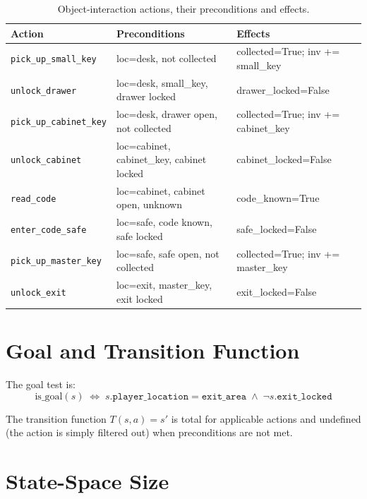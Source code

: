 \documentclass[12pt, a4paper]{report}
\begin{document}
\begin{table}[H]
\centering
\caption{Object-interaction actions, their preconditions and effects.}
\label{tab:actions}
\begin{tabular}{L{3.4cm}L{5.2cm}L{4cm}}
\toprule
\textbf{Action} & \textbf{Preconditions} & \textbf{Effects} \\
\midrule
\texttt{pick\_up\_small\_key}    & loc=desk, not collected    & collected=True; inv += small\_key \\
\texttt{unlock\_drawer}          & loc=desk, small\_key, drawer locked  & drawer\_locked=False \\
\texttt{pick\_up\_cabinet\_key}  & loc=desk, drawer open, not collected & collected=True; inv += cabinet\_key \\
\texttt{unlock\_cabinet}         & loc=cabinet, cabinet\_key, cabinet locked & cabinet\_locked=False \\
\texttt{read\_code}              & loc=cabinet, cabinet open, unknown & code\_known=True \\
\texttt{enter\_code\_safe}       & loc=safe, code known, safe locked  & safe\_locked=False \\
\texttt{pick\_up\_master\_key}   & loc=safe, safe open, not collected & collected=True; inv += master\_key \\
\texttt{unlock\_exit}            & loc=exit, master\_key, exit locked & exit\_locked=False \\
\bottomrule
\end{tabular}
\end{table}

\section{Goal and Transition Function}

The goal test is:
\[
  \text{is\_goal}(s)
  \;\Leftrightarrow\;
  s.\texttt{player\_location} = \texttt{exit\_area}
  \;\land\;
  \lnot s.\texttt{exit\_locked}
\]

The transition function $T(s, a) = s'$ is total for applicable actions and
undefined (the action is simply filtered out) when preconditions are not met.

\section{State-Space Size}
\end{document}
